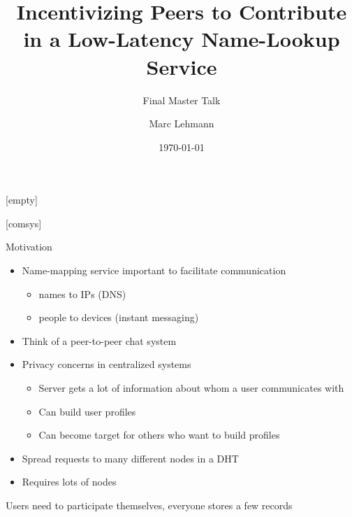 \documentclass[presentation,english,usenames,dvipsnames]{beamer}
\title[Peer-to-Peer Incentives]{Incentivizing Peers to Contribute in a
Low-Latency Name-Lookup Service}
\author{Marc Lehmann}
\subtitle{Final Master Talk}
\date{\today}
\begin{document}
[empty]
\begin{frame}
  \titlepage
\end{frame}

[comsys]

\begin{frame}{Motivation}
  \begin{itemize}
    \item Name-mapping service important to facilitate communication
    \begin{itemize}
      \item names to IPs (DNS)
      \item people to devices (instant messaging)
    \end{itemize}
    \item Think of a peer-to-peer chat system

    \pause

    \item Privacy concerns in centralized systems
    \begin{itemize}
      \item Server gets a lot of information about whom a user communicates with
      \item Can build user profiles
      \item Can become target for others who want to build profiles
    \end{itemize}
    \item Spread requests to many different nodes in a DHT
    \item Requires lots of nodes
  \end{itemize}

  \pause

  \begin{block}{}
    Users need to participate themselves, everyone stores a few records
  \end{block}
\end{frame}
\end{document}
